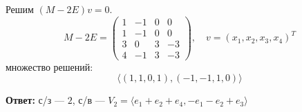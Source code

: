 \documentclass[a4paper]{article}
\begin{document}
\begin{enumerate}
\begin{enumerate}
    Решим \((M-2E)v=0\).  
    \[
    M-2E = 
    \begin{pmatrix}
    1 & -1 & 0 & 0\\
    1 & -1 & 0 & 0\\
    3 &  0 & 3 & -3\\
    4 & -1 & 3 & -3
    \end{pmatrix},
    \quad
    v=(x_1,x_2,x_3,x_4)^T
    \]
    множество решений:
    $$\langle (1, 1, 0, 1), (-1, -1, 1, 0)\rangle$$

    \textbf{Ответ: } с/з --- $2$, с/в --- $V_2 = \langle e_1 + e_2 + e_4, -e_1-e_2+e_3 \rangle$


   \end{enumerate}


\end{enumerate}
\end{document}
